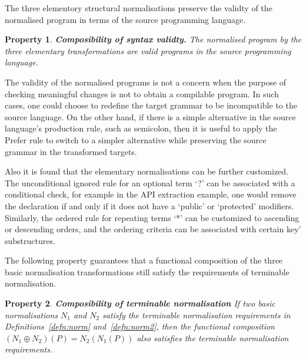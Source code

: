 \documentclass[10pt, conference, compsocconf]{IEEEtran}
\newtheorem{property}{Property}
\begin{document}
The three elementory structural normalisations preserve the validty of the normalised program in terms of the source programming language. %
\begin{property}
{\bf Composibility of syntax validty.\label{defn:norm4}} The normalised program by the three elementary transformations are valid programs in the {\em source} programming language.
\end{property}

The validity of the normalised programs is not a concern when the purpose of checking meaningful changes is not to obtain a compilable program. In such cases, one could choose to redefine the target grammar to be incompatible to the source language. On the other hand, if there is a simple alternative in the source language's production rule, such as semicolon, then it is useful to apply the Prefer rule to switch to a simpler alternative while preserving the source grammar in the transformed targets.

Also it is found that the elementary normalisations can be further customized. The unconditional ignored rule for an optional term `?' can be associated with a conditional check, for example in the API extraction example, one would remove the declaration if and only if it does not have a `public' or `protected' modifiers. Similarly, the ordered rule for repeating terms `*' can be customized to ascending or descending orders, and the ordering criteria can be associated with certain key' substructures.

The following property guarantees that a functional composition of the three basic normalisation transformations still satisfy the requirements of terminable normalisation.
\begin{property} {\bf Composibility of terminable normalisation}
If two basic normalisations $N_1$ and $N_2$ satisfy the terminable normalisation requirements in Definitions~\ref{defn:norm} and~\ref{defn:norm2}, then the functional composition $(N_1 \oplus N_2) (P) = N_2 (N_1(P))$ also satisfies the terminable normalisation requirements.
\end{property}
\end{document}
